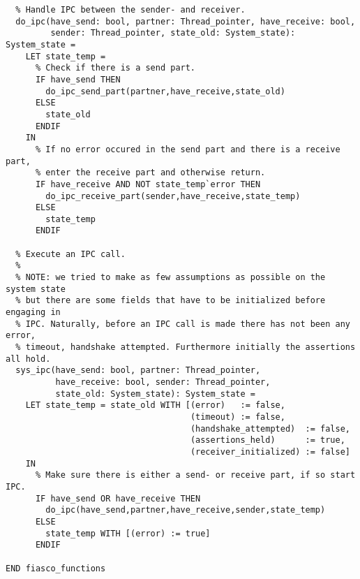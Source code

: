 \begin{lstlisting}
  % Handle IPC between the sender- and receiver.
  do_ipc(have_send: bool, partner: Thread_pointer, have_receive: bool,
         sender: Thread_pointer, state_old: System_state): System_state =    
    LET state_temp =
      % Check if there is a send part.
      IF have_send THEN
        do_ipc_send_part(partner,have_receive,state_old)
      ELSE
        state_old
      ENDIF
    IN
      % If no error occured in the send part and there is a receive part, 
      % enter the receive part and otherwise return.
      IF have_receive AND NOT state_temp`error THEN
        do_ipc_receive_part(sender,have_receive,state_temp)
      ELSE
        state_temp
      ENDIF

  % Execute an IPC call.
  %
  % NOTE: we tried to make as few assumptions as possible on the system state
  % but there are some fields that have to be initialized before engaging in 
  % IPC. Naturally, before an IPC call is made there has not been any error,
  % timeout, handshake attempted. Furthermore initially the assertions all hold.
  sys_ipc(have_send: bool, partner: Thread_pointer,
          have_receive: bool, sender: Thread_pointer,
          state_old: System_state): System_state = 
    LET state_temp = state_old WITH [(error)   := false,
                                     (timeout) := false,
                                     (handshake_attempted)  := false,
                                     (assertions_held)      := true,
                                     (receiver_initialized) := false]
    IN
      % Make sure there is either a send- or receive part, if so start IPC.
      IF have_send OR have_receive THEN
        do_ipc(have_send,partner,have_receive,sender,state_temp)
      ELSE
        state_temp WITH [(error) := true]
      ENDIF

END fiasco_functions
\end{lstlisting}